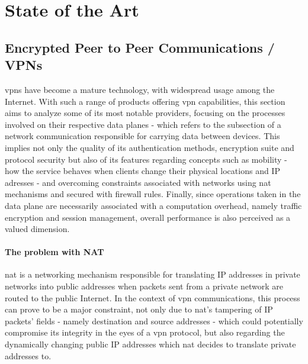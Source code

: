 \documentclass[11pt,twoside,a4paper]{report}
\begin{document}
\cleardoublepage


\chapter{State of the Art}
\label{chapter:sota}

\section{Encrypted Peer to Peer Communications / VPNs}

\acrshort{vpn}s have become a mature technology, with widespread usage among the Internet. With such a range of products offering \acrshort{vpn} capabilities, this section aims to analyze some of its most notable providers, focusing on the processes involved on their respective data planes - which refers to the subsection of a network communication responsible for carrying data between devices. This implies not only the quality of its authentication methods, encryption suite and protocol security but also of its features regarding concepts such as mobility - how the service behaves when clients change their physical locations and IP adresses - and overcoming constraints associated with networks using \acrshort{nat} mechanisms and secured with firewall rules. Finally, since operations taken in the data plane are necessarily associated with a computation overhead, namely traffic encryption and session management, overall performance is also perceived as a valued dimension.

\subsubsection{The problem with NAT}

\acrfull{nat} is a networking mechanism responsible for translating IP addresses in private networks into public addresses when packets sent from a private network are routed to the public Internet. In the context of \acrshort{vpn} communications, this process can prove to be a major constraint, not only due to \acrshort{nat}'s tampering of IP packets' fields - namely destination and source addresses - which could potentially compromise its integrity in the eyes of a \acrshort{vpn} protocol, but also regarding the dynamically changing public IP addresses which \acrshort{nat} decides to translate private addresses to.
\end{document}
